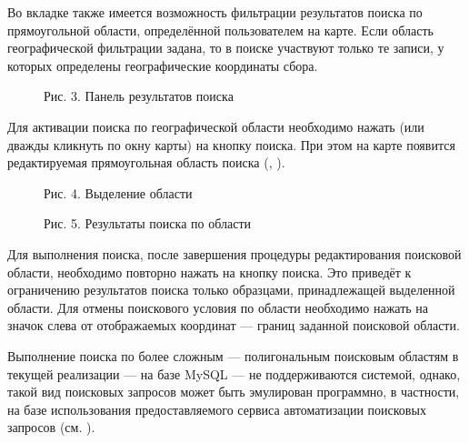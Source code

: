 \documentclass[letterpaper,10pt,russian]{sphinxmanual}
\begin{document}
Во вкладке  также имеется возможность фильтрации результатов поиска
по прямоугольной области, определённой пользователем на карте.
Если область географической фильтрации задана, то в поиске участвуют только
те записи, у которых определены географические координаты сбора.

\begin{figure}[htbp]
\centering
\capstart

\noindent{}
\caption{Рис. 3. Панель результатов поиска}\label{\detokenize{search_basics:fig3}}\label{\detokenize{search_basics:id8}}\end{figure}

Для активации поиска по географической области необходимо нажать
(или дважды кликнуть по окну карты) на кнопку поиска.
При этом на карте появится редактируемая прямоугольная область поиска ({\hyperref[\detokenize{search_basics:fig4}]{}}, {\hyperref[\detokenize{search_basics:fig5}]{}}).

\ignorespaces 
\begin{figure}[htbp]
\centering
\capstart

\noindent{}
\caption{Рис. 4. Выделение области}\label{\detokenize{search_basics:fig4}}\label{\detokenize{search_basics:id9}}\end{figure}

\begin{figure}[htbp]
\centering
\capstart

\noindent{}
\caption{Рис. 5. Результаты поиска по области}\label{\detokenize{search_basics:fig5}}\label{\detokenize{search_basics:id10}}\end{figure}

Для выполнения поиска, после завершения процедуры редактирования
поисковой области, необходимо повторно нажать на кнопку поиска.
Это приведёт к ограничению результатов поиска только образцами, принадлежащей
выделенной области. Для отмены поискового условия по области необходимо
нажать на значок  слева от отображаемых координат — границ заданной поисковой области.

\ignorespaces 
Выполнение поиска по более сложным — полигональным
поисковым областям в текущей реализации — на  базе MySQL —
не поддерживаются системой, однако,
такой вид поисковых запросов может быть эмулирован программно,
в частности, на базе использования предоставляемого сервиса автоматизации поисковых запросов
(см. {\hyperref[\detokenize{http_api:search-httpapi-examples}]{}}).
\end{document}

